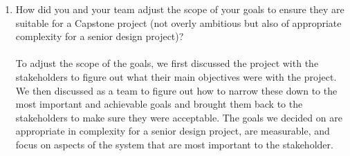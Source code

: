 \documentclass{article}
\begin{document}
\begin{enumerate}
  \item How did you and your team adjust the scope of your goals to ensure
    they are suitable for a Capstone project (not overly ambitious but also of
    appropriate complexity for a senior design project)?\\
    \\
To adjust the scope of the goals, we first discussed the project with the stakeholders to figure out what
their main objectives were with the project. We then discussed as a team to figure out how to narrow
these down to the most important and achievable goals and brought them back to the stakeholders to
make sure they were acceptable. The goals we decided on are appropriate in complexity for a senior
design project, are measurable, and focus on aspects of the system that are most important to the
stakeholder.
\end{enumerate}
\end{document}
